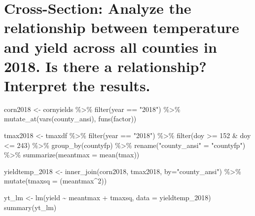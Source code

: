 \documentclass[
]{book}
\newenvironment{Shaded}{\begin{snugshade}}{\end{snugshade}}
\newcommand{\AttributeTok}[1]{\textcolor[rgb]{0.77,0.63,0.00}{#1}}
\newcommand{\DecValTok}[1]{\textcolor[rgb]{0.00,0.00,0.81}{#1}}
\newcommand{\FunctionTok}[1]{\textcolor[rgb]{0.00,0.00,0.00}{#1}}
\newcommand{\NormalTok}[1]{#1}
\newcommand{\OtherTok}[1]{\textcolor[rgb]{0.56,0.35,0.01}{#1}}
\newcommand{\SpecialCharTok}[1]{\textcolor[rgb]{0.00,0.00,0.00}{#1}}
\newcommand{\StringTok}[1]{\textcolor[rgb]{0.31,0.60,0.02}{#1}}
\begin{document}
\hypertarget{cross-section-analyze-the-relationship-between-temperature-and-yield-across-all-counties-in-2018.-is-there-a-relationship-interpret-the-results.}{%
\section{Cross-Section: Analyze the relationship between temperature and yield across all counties in 2018. Is there a relationship? Interpret the results.}\label{cross-section-analyze-the-relationship-between-temperature-and-yield-across-all-counties-in-2018.-is-there-a-relationship-interpret-the-results.}}

\begin{Shaded}
\begin{Highlighting}[]
\NormalTok{corn2018 }\OtherTok{\textless{}{-}}\NormalTok{ cornyields }\SpecialCharTok{\%\textgreater{}\%}
  \FunctionTok{filter}\NormalTok{(year }\SpecialCharTok{==} \StringTok{"2018"}\NormalTok{) }\SpecialCharTok{\%\textgreater{}\%}
  \FunctionTok{mutate\_at}\NormalTok{(}\FunctionTok{vars}\NormalTok{(county\_ansi), }\FunctionTok{funs}\NormalTok{(factor))}
  
\NormalTok{tmax2018 }\OtherTok{\textless{}{-}}\NormalTok{ tmaxdf }\SpecialCharTok{\%\textgreater{}\%}
  \FunctionTok{filter}\NormalTok{(year }\SpecialCharTok{==} \StringTok{"2018"}\NormalTok{) }\SpecialCharTok{\%\textgreater{}\%}
  \FunctionTok{filter}\NormalTok{(doy }\SpecialCharTok{\textgreater{}=} \DecValTok{152} \SpecialCharTok{\&}\NormalTok{ doy }\SpecialCharTok{\textless{}=} \DecValTok{243}\NormalTok{) }\SpecialCharTok{\%\textgreater{}\%}
  \FunctionTok{group\_by}\NormalTok{(countyfp) }\SpecialCharTok{\%\textgreater{}\%}
  \FunctionTok{rename}\NormalTok{(}\StringTok{"county\_ansi"} \OtherTok{=} \StringTok{"countyfp"}\NormalTok{) }\SpecialCharTok{\%\textgreater{}\%}
  \FunctionTok{summarize}\NormalTok{(}\AttributeTok{meantmax =} \FunctionTok{mean}\NormalTok{(tmax))}

\NormalTok{yieldtemp\_2018 }\OtherTok{\textless{}{-}} \FunctionTok{inner\_join}\NormalTok{(corn2018, tmax2018, }\AttributeTok{by=}\StringTok{"county\_ansi"}\NormalTok{) }\SpecialCharTok{\%\textgreater{}\%}
  \FunctionTok{mutate}\NormalTok{(}\AttributeTok{tmaxsq =}\NormalTok{ (meantmax}\SpecialCharTok{\^{}}\DecValTok{2}\NormalTok{))}

\NormalTok{yt\_lm }\OtherTok{\textless{}{-}} \FunctionTok{lm}\NormalTok{(yield }\SpecialCharTok{\textasciitilde{}}\NormalTok{ meantmax }\SpecialCharTok{+}\NormalTok{ tmaxsq, }\AttributeTok{data =}\NormalTok{ yieldtemp\_2018)}
\FunctionTok{summary}\NormalTok{(yt\_lm)}
\end{Highlighting}
\end{Shaded}
\end{document}
